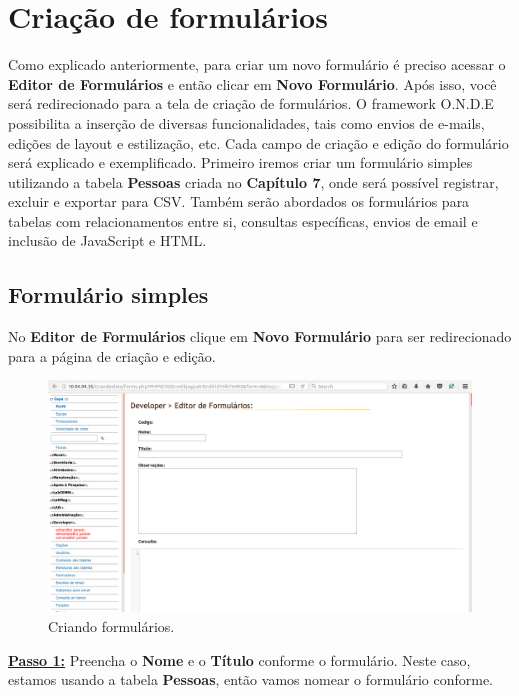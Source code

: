 \documentclass[9pt]{report}
\begin{document}
{     \section{Criação de formulários}

     Como explicado anteriormente, para criar um novo formulário é
     preciso acessar o \textbf{Editor de Formulários} e então clicar
     em \textbf{Novo Formulário}. Após isso, você será redirecionado
     para a tela de criação de formulários. O framework O.N.D.E
     possibilita a inserção de diversas funcionalidades, tais como
     envios de e-mails, edições de layout e estilização, etc. Cada
     campo de criação e edição do formulário será explicado e
     exemplificado. Primeiro iremos criar um formulário simples
     utilizando a tabela \textbf{Pessoas} criada no
     \textbf{Capítulo 7}, onde será possível registrar, excluir e
     exportar para CSV. Também serão abordados os formulários para
     tabelas com relacionamentos entre si, consultas específicas,
     envios de email e inclusão de JavaScript e HTML.

      \subsection{Formulário simples}

      No \textbf{Editor de Formulários} clique em
      \textbf{Novo Formulário} para ser redirecionado para a página
      de criação e edição.

     \begin{figure}[H]
      \includegraphics[width=\textwidth]{2_Formularios/2_Criacao_de_formularios/3.png}
      \caption{Criando formulários.}
      \label{fig:editorform}
     \end{figure}

     \underline{\textbf{Passo 1:}} Preencha o \textbf{Nome} e o
     \textbf{Título} conforme o formulário. Neste caso, estamos
     usando a tabela \textbf{Pessoas}, então vamos nomear o
     formulário conforme.
     
}
\end{document}
